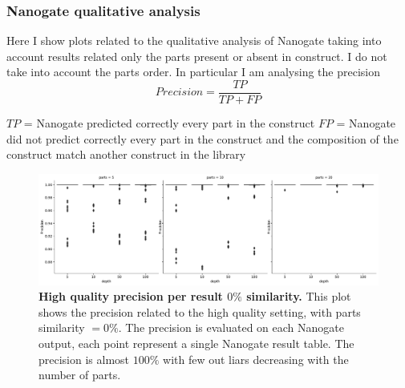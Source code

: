\documentclass[11pt, a4paper]{article}
\begin{document}
\clearpage
\subsubsection{Nanogate qualitative analysis }
Here I show plots related to the qualitative analysis of Nanogate taking into account results related only the parts present or absent in construct. I do not take into account the parts order.
In particular I am analysing the precision
\begin{equation}
    Precision = \frac{TP}{TP + FP}
\end{equation}

$TP$ = Nanogate predicted correctly every part in the construct
$FP$ = Nanogate did not predict correctly every part in the construct and the composition of the construct match another construct in the library

\begin{figure}[ht]
    \begin{center}
    \includegraphics[width=1.35\textwidth]{../results/images_notebook/v_500/hq_sim_00_precision_per_result.pdf}
    \end{center}
    \caption{{\bf High quality precision per result $0\%$ similarity.} This plot shows the precision related to the high quality setting, with parts similarity $=0\%$. The precision is evaluated on each  Nanogate output, each point represent a single Nanogate result table. The precision is almost $100\%$ with few out liars decreasing with the number of parts.}
   \label{fig:v_500_hq_sim_00_precision_per_result}
\end{figure}
\end{document}
